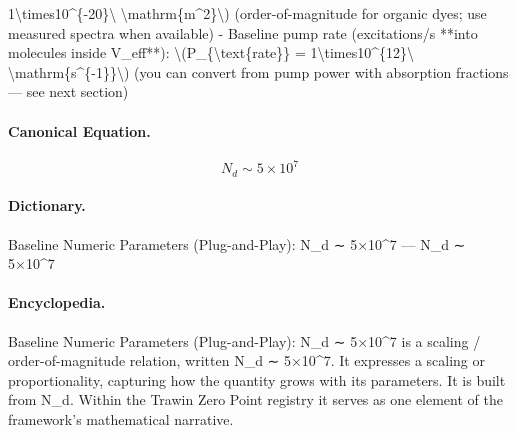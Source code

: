 1\textbackslash{}times10\textasciicircum{}\{-20\}\textbackslash{} \textbackslash{}mathrm\{m\textasciicircum{}2\}\textbackslash{}) (order-of-magnitude for organic dyes; use measured spectra when available) - Baseline pump rate (excitations/s **into molecules inside V\_eff**): \textbackslash{}(P\_\{\textbackslash{}text\{rate\}\} = 1\textbackslash{}times10\textasciicircum{}\{12\}\textbackslash{} \textbackslash{}mathrm\{s\textasciicircum{}\{-1\}\}\textbackslash{}) (you can convert from pump power with absorption fractions — see next section)

\paragraph{Canonical Equation.}
\[
N_d \sim 5\times10^{7}
\]

\paragraph{Dictionary.}
Baseline Numeric Parameters (Plug-and-Play): N\_d ∼ 5×10\textasciicircum{}7 — N\_d ∼ 5×10\textasciicircum{}7

\paragraph{Encyclopedia.}
Baseline Numeric Parameters (Plug-and-Play): N\_d ∼ 5×10\textasciicircum{}7 is a scaling / order-of-magnitude relation, written N\_d ∼ 5×10\textasciicircum{}7. It expresses a scaling or proportionality, capturing how the quantity grows with its parameters. It is built from N\_d. Within the Trawin Zero Point registry it serves as one element of the framework's mathematical narrative.
